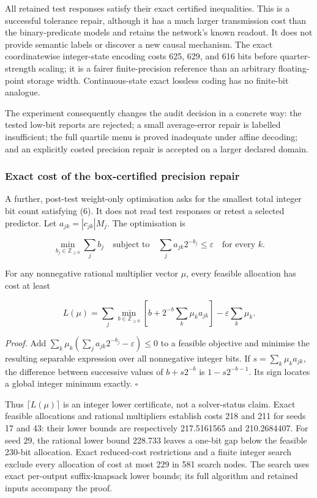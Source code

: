 \documentclass[
  british,
  11pt,
  a4paper,
]{article}
\begin{document}
All retained test responses satisfy their exact certified inequalities.
This is a successful tolerance repair, although it has a much larger
transmission cost than the binary-predicate models and retains the
network's known readout. It does not provide semantic labels or discover
a new causal mechanism. The exact coordinatewise integer-state encoding
costs 625, 629, and 616 bits before quarter-strength scaling; it is a
fairer finite-precision reference than an arbitrary floating-point
storage width. Continuous-state exact lossless coding has no finite-bit
analogue.

The experiment consequently changes the audit decision in a concrete
way: the tested low-bit reports are rejected; a small average-error
repair is labelled insufficient; the full quartile menu is proved
inadequate under affine decoding; and an explicitly costed precision
repair is accepted on a larger declared domain.

\subsubsection{Exact cost of the box-certified precision
repair}\label{exact-cost-of-the-box-certified-precision-repair}

A further, post-test weight-only optimisation asks for the smallest
total integer bit count satisfying (6). It does not read test responses
or retest a selected predictor. Let \(a_{jk}=|c_{jk}|M_j\). The
optimisation is

\[
\min_{b_j\in\mathbb Z_{\ge0}}\sum_j b_j
\quad\text{subject to}\quad
\sum_j a_{jk}2^{-b_j}\le\varepsilon\quad\text{for every }k.
\tag{7}
\]

For any nonnegative rational multiplier vector \(\mu\), every feasible
allocation has cost at least

\[
L(\mu)=\sum_j\min_{b\in\mathbb Z_{\ge0}}
\left[b+2^{-b}\sum_k\mu_k a_{jk}\right]
-\varepsilon\sum_k\mu_k.
\tag{8}
\]

\emph{Proof.} Add \(\sum_k\mu_k(\sum_ja_{jk}2^{-b_j}-\varepsilon)\le0\)
to a feasible objective and minimise the resulting separable expression
over all nonnegative integer bits. If \(s=\sum_k\mu_ka_{jk}\), the
difference between successive values of \(b+s2^{-b}\) is
\(1-s2^{-b-1}\). Its sign locates a global integer minimum exactly.
\(\square\)

Thus \(\lceil L(\mu)\rceil\) is an integer lower certificate, not a
solver-status claim. Exact feasible allocations and rational multipliers
establish costs 218 and 211 for seeds 17 and 43: their lower bounds are
respectively 217.5161565 and 210.2684407. For seed 29, the rational
lower bound 228.733 leaves a one-bit gap below the feasible 230-bit
allocation. Exact reduced-cost restrictions and a finite integer search
exclude every allocation of cost at most 229 in 581 search nodes. The
search uses exact per-output suffix-knapsack lower bounds; its full
algorithm and retained inputs accompany the proof.
\end{document}
